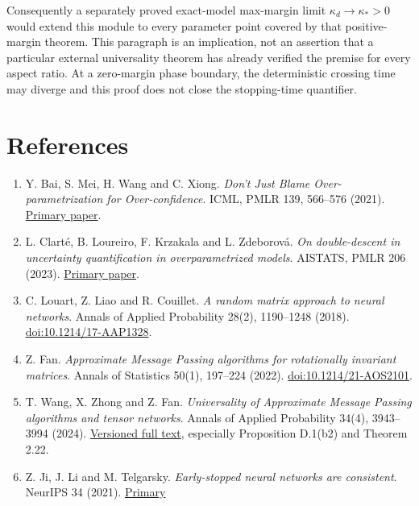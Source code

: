 \documentclass[
  11pt,
  a4paper,
]{article}
\providecommand{\tightlist}{%
  \setlength{\itemsep}{0pt}\setlength{\parskip}{0pt}}
\begin{document}
Consequently a separately proved exact-model max-margin limit
\(\kappa_d\to\kappa_*>0\) would extend this module to every parameter
point covered by that positive-margin theorem. This paragraph is an
implication, not an assertion that a particular external universality
theorem has already verified the premise for every aspect ratio. At a
zero-margin phase boundary, the deterministic crossing time may diverge
and this proof does not close the stopping-time quantifier.

\clearpage

\hypertarget{references}{%
\section{References}\label{references}}

\begin{enumerate}
\def\labelenumi{\arabic{enumi}.}
\tightlist
\item
  Y. Bai, S. Mei, H. Wang and C. Xiong. \emph{Don't Just Blame
  Over-parametrization for Over-confidence}. ICML, PMLR 139, 566--576
  (2021). \href{https://proceedings.mlr.press/v139/bai21c.html}{Primary
  paper}.
\item
  L. Clarté, B. Loureiro, F. Krzakala and L. Zdeborová. \emph{On
  double-descent in uncertainty quantification in overparametrized
  models}. AISTATS, PMLR 206 (2023).
  \href{https://proceedings.mlr.press/v206/clarte23a.html}{Primary
  paper}.
\item
  C. Louart, Z. Liao and R. Couillet. \emph{A random matrix approach to
  neural networks}. Annals of Applied Probability 28(2), 1190--1248
  (2018).
  \href{https://doi.org/10.1214/17-AAP1328}{doi:10.1214/17-AAP1328}.
\item
  Z. Fan. \emph{Approximate Message Passing algorithms for rotationally
  invariant matrices}. Annals of Statistics 50(1), 197--224 (2022).
  \href{https://doi.org/10.1214/21-AOS2101}{doi:10.1214/21-AOS2101}.
\item
  T. Wang, X. Zhong and Z. Fan. \emph{Universality of Approximate
  Message Passing algorithms and tensor networks}. Annals of Applied
  Probability 34(4), 3943--3994 (2024).
  \href{https://arxiv.org/html/2206.13037v5}{Versioned full text},
  especially Proposition D.1(b2) and Theorem 2.22.
\item
  Z. Ji, J. Li and M. Telgarsky. \emph{Early-stopped neural networks are
  consistent}. NeurIPS 34 (2021).
  \href{https://proceedings.neurips.cc/paper/2021/file/0e1ebad68af7f0ae4830b7ac92bc3c6f-Paper.pdf}{Primary
}
\end{enumerate}
\end{document}
